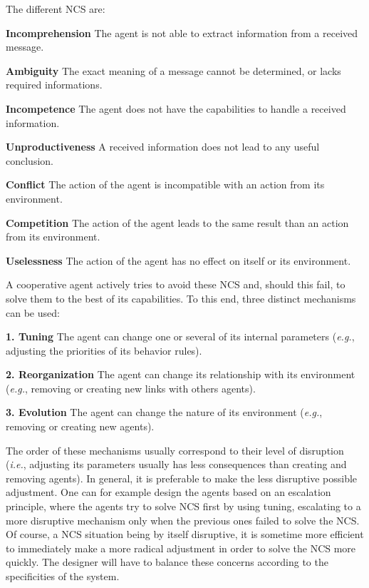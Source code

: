 The different NCS are:
\begin{compactitem}
\item\textbf{Incomprehension} The agent is not able to extract information from a received message.
\item\textbf{Ambiguity} The exact meaning of a message cannot be determined, or lacks required informations.
\item\textbf{Incompetence} The agent does not have the capabilities to handle a received information.
\item\textbf{Unproductiveness} A received information does not lead to any useful conclusion.
\item\textbf{Conflict} The action of the agent is incompatible with an action from its environment.
\item\textbf{Competition} The action of the agent leads to the same result than an action from its environment.
\item\textbf{Uselessness} The action of the agent has no effect on itself or its environment.
\end{compactitem}

A cooperative agent actively tries to avoid these NCS and, should this fail, to solve them to the best of its capabilities. To this end, three distinct mechanisms can be used\cite{bonjean2009engineering}:

\begin{compactitem}
\item\textbf{1. Tuning} The agent can change one or several of its internal parameters (\textit{e.g.}, adjusting the priorities of its behavior rules).
\item\textbf{2. Reorganization} The agent can change its relationship with its environment (\textit{e.g.}, removing or creating new links with others agents).
\item\textbf{3. Evolution} The agent can change the nature of its environment (\textit{e.g.}, removing or creating new agents).
\end{compactitem}

The order of these mechanisms usually correspond to their level of disruption (\textit{i.e.}, adjusting its parameters usually has less consequences than creating and removing agents). In general, it is preferable to make the less disruptive possible adjustment. One can for example design the agents based on an escalation principle, where the agents try to solve NCS first by using tuning, escalating to a more disruptive mechanism only when the previous ones failed to solve the NCS. Of course, a NCS situation being by itself disruptive, it is sometime more efficient to immediately make a more radical adjustment in order to solve the NCS more quickly. The designer will have to balance these concerns according to the specificities of the system.

